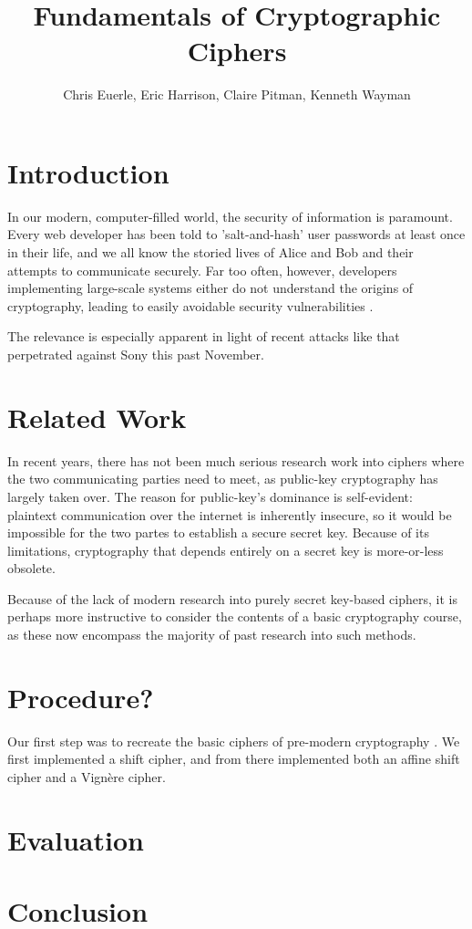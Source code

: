 \documentclass[11pt]{article}
\title{\textbf{Fundamentals of Cryptographic Ciphers}}
\author{Chris Euerle, Eric Harrison, Claire Pitman, Kenneth Wayman}
\date{}
\begin{document}
\maketitle

\section{Introduction}

\hspace{4mm} In our modern, computer-filled world, the security of information is paramount. Every web developer has been told to 'salt-and-hash' user passwords at least once in their life, and we all know the storied lives of Alice and Bob and their attempts to communicate securely.  Far too often, however, developers implementing large-scale systems either do not understand the origins of cryptography, leading to easily avoidable security vulnerabilities \cite{Software-Security}.

\vspace{3mm}

The relevance is especially apparent in light of recent attacks like that perpetrated against Sony this past November.  

\section{Related Work}
\hspace{4mm} 	In recent years, there has not been much serious research work into ciphers where the two communicating parties need to meet, as public-key cryptography has largely taken over.  The reason for public-key's dominance is self-evident: plaintext communication over the internet is inherently insecure, so it would be impossible for the two partes to establish a secure secret key.  Because of its limitations, cryptography that depends entirely on a secret key is more-or-less obsolete.  

\vspace{3mm}

	Because of the lack of modern research into purely secret key-based ciphers, it is perhaps more instructive to consider the contents of a basic cryptography course, as these now encompass the majority of past research into such methods.  
\section{Procedure?}
\hspace{4mm}	Our first step was to recreate the basic ciphers of pre-modern cryptography \cite{Alice-and-Bob}.  We first implemented a shift cipher, and from there implemented both an affine shift cipher and a Vign\`ere cipher.  
\section{Evaluation}

\section{Conclusion}


{}

\end{document}
